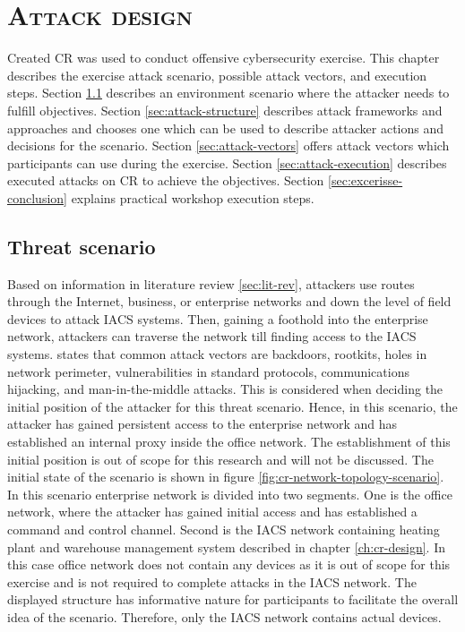 \chapter{\textsc{Attack design}} \label{ch:attack-design}

Created CR was used to conduct offensive cybersecurity exercise. This chapter describes the exercise attack scenario, possible attack vectors, and execution steps. Section \ref{sec:thret-scenario} describes an environment scenario where the attacker needs to fulfill objectives. Section \ref{sec:attack-structure} describes attack frameworks and approaches and chooses one which can be used to describe attacker actions and decisions for the scenario. Section \ref{sec:attack-vectors} offers attack vectors which participants can use during the exercise. Section \ref{sec:attack-execution} describes executed attacks on CR to achieve the objectives. Section \ref{sec:excerisse-conclusion} explains practical workshop execution steps.

\section{Threat scenario} \label{sec:thret-scenario}

Based on information in literature review \ref{sec:lit-rev},  attackers use routes through the Internet, business, or enterprise networks and down the level of field devices to attack IACS systems. Then, gaining a foothold into the enterprise network, attackers can traverse the network till finding access to the IACS systems. \citeauthor{72-ics-atack-taxonomy} \parencite{72-ics-atack-taxonomy} states that common attack vectors are backdoors, rootkits, holes in network perimeter, vulnerabilities in standard protocols, communications hijacking, and man-in-the-middle attacks. This is considered when deciding the initial position of the attacker for this threat scenario. Hence, in this scenario, the attacker has gained persistent access to the enterprise network and has established an internal proxy inside the office network. The establishment of this initial position is out of scope for this research and will not be discussed. The initial state of the scenario is shown in figure \ref{fig:cr-network-topology-scenario}. In this scenario enterprise network is divided into two segments. One is the office network, where the attacker has gained initial access and has established a command and control channel. Second is the IACS network containing heating plant and warehouse management system described in chapter \ref{ch:cr-design}. In this case office network does not contain any devices as it is out of scope for this exercise and is not required to complete attacks in the IACS network. The displayed structure has informative nature for participants to facilitate the overall idea of the scenario. Therefore, only the IACS network contains actual devices.


